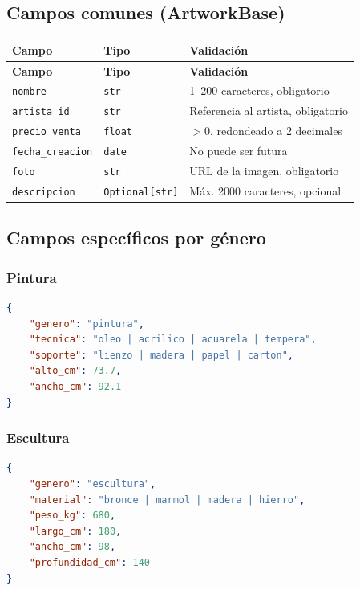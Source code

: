 \documentclass[12pt,a4paper]{article}
\begin{document}
\subsection{Campos comunes (ArtworkBase)}

\begin{longtable}{lll}
\toprule
\textbf{Campo} & \textbf{Tipo} & \textbf{Validación} \\
\midrule
\endfirsthead
\toprule
\textbf{Campo} & \textbf{Tipo} & \textbf{Validación} \\
\midrule
\endhead
\bottomrule
\endfoot
\texttt{nombre} & \texttt{str} & 1--200 caracteres, obligatorio \\
\texttt{artista\_id} & \texttt{str} & Referencia al artista, obligatorio \\
\texttt{precio\_venta} & \texttt{float} & $> 0$, redondeado a 2 decimales \\
\texttt{fecha\_creacion} & \texttt{date} & No puede ser futura \\
\texttt{foto} & \texttt{str} & URL de la imagen, obligatorio \\
\texttt{descripcion} & \texttt{Optional[str]} & Máx. 2000 caracteres, opcional \\
\bottomrule
\end{longtable}

\subsection{Campos específicos por género}

\subsubsection{Pintura}

\begin{lstlisting}[language=json]
{
    "genero": "pintura",
    "tecnica": "oleo | acrilico | acuarela | tempera",
    "soporte": "lienzo | madera | papel | carton",
    "alto_cm": 73.7,
    "ancho_cm": 92.1
}
\end{lstlisting}

\subsubsection{Escultura}

\begin{lstlisting}[language=json]
{
    "genero": "escultura",
    "material": "bronce | marmol | madera | hierro",
    "peso_kg": 680,
    "largo_cm": 180,
    "ancho_cm": 98,
    "profundidad_cm": 140
}
\end{lstlisting}
\end{document}
